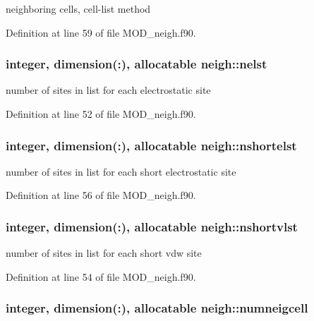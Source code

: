 neighboring cells, cell-\/list method 



Definition at line 59 of file M\-O\-D\-\_\-neigh.\-f90.

\hypertarget{classneigh_af262864038c308dd317cf32e78609ecd}{
\subsubsection[{nelst}]{\setlength{\rightskip}{0pt plus 5cm}integer, dimension(\-:), allocatable neigh\-::nelst}}\label{classneigh_af262864038c308dd317cf32e78609ecd}


number of sites in list for each electrostatic site 



Definition at line 52 of file M\-O\-D\-\_\-neigh.\-f90.

\hypertarget{classneigh_a1a4c1aa7767a563fd0c9566eefccd545}{
\subsubsection[{nshortelst}]{\setlength{\rightskip}{0pt plus 5cm}integer, dimension(\-:), allocatable neigh\-::nshortelst}}\label{classneigh_a1a4c1aa7767a563fd0c9566eefccd545}


number of sites in list for each short electrostatic site 



Definition at line 56 of file M\-O\-D\-\_\-neigh.\-f90.

\hypertarget{classneigh_a3d0ef9d60a1a7083ee02308853aa164b}{
\subsubsection[{nshortvlst}]{\setlength{\rightskip}{0pt plus 5cm}integer, dimension(\-:), allocatable neigh\-::nshortvlst}}\label{classneigh_a3d0ef9d60a1a7083ee02308853aa164b}


number of sites in list for each short vdw site 



Definition at line 54 of file M\-O\-D\-\_\-neigh.\-f90.

\hypertarget{classneigh_a6ecf67821627bc917720dcf2dcd703a6}{
\subsubsection[{numneigcell}]{\setlength{\rightskip}{0pt plus 5cm}integer, dimension(\-:), allocatable neigh\-::numneigcell}}\label{classneigh_a6ecf67821627bc917720dcf2dcd703a6}


